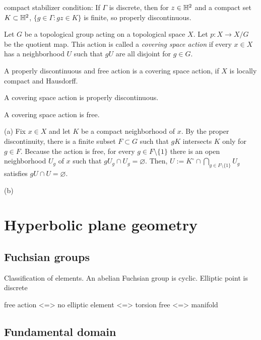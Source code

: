 \documentclass[a4paper]{article}
\begin{document}
compact stabilizer condition:
If $\Gamma$ is discrete, then for $z\in\mathbb{H}^2$ and a compact set $K\subset\mathbb{H}^2$, $\{g\in\Gamma:gz\in K\}$ is finite, so properly discontinuous.




\begin{prb}
Let $G$ be a topological group acting on a topological space $X$.
Let $p:X\to X/G$ be the quotient map.
This action is called a \emph{covering space action} if every $x\in X$ has a neighborhood $U$ such that $gU$ are all disjoint for $g\in G$.
\begin{parts}
\item A properly discontinuous and free action is a covering space action, if $X$ is locally compact and Hausdorff.
\item A covering space action is properly discontinuous.
\item A covering space action is free.
\end{parts}
\end{prb}
\begin{pf}
(a)
Fix $x\in X$ and let $K$ be a compact neighborhood of $x$.
By the proper discontinuity, there is a finite subset $F\subset G$ such that $gK$ intersects $K$ only for $g\in F$.
Because the action is free, for every $g\in F\setminus\{1\}$ there is an open neighborhood $U_g$ of $x$ such that $gU_g\cap U_g=\varnothing$.
Then, $U:=K^\circ\cap\bigcap_{g\in F\setminus\{1\}}U_g$ satisfies $gU\cap U=\varnothing$.

(b)

\end{pf}



\section{Hyperbolic plane geometry}
\subsection{Fuchsian groups}
Classification of elements.
An abelian Fuchsian group is cyclic.
Elliptic point is discrete

free action <=> no elliptic element <=> torsion free <=> manifold

\subsection{Fundamental domain}
\end{document}
